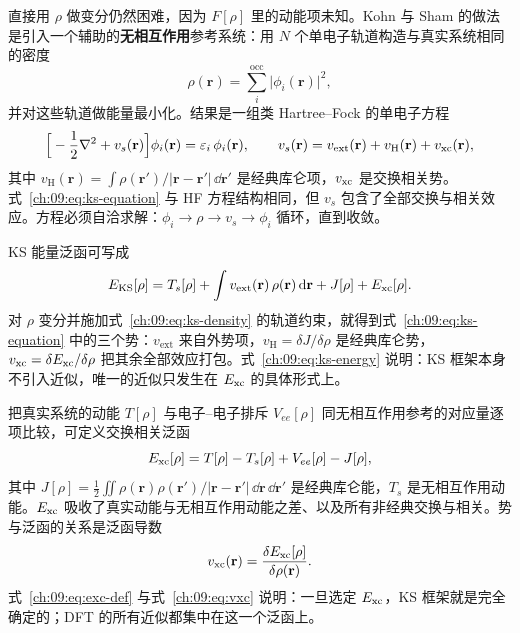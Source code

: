 直接用 $\rho$ 做变分仍然困难，因为 $F[\rho]$ 里的动能项未知。Kohn 与 Sham 的做法是引入一个辅助的\textbf{无相互作用}参考系统\citep{kohn1965,parr1989}：用 $N$ 个单电子轨道构造与真实系统相同的密度
\begin{equation}
\rho(\mathbf{r}) = \sum_{i}^{\mathrm{occ}} \lvert \phi_i(\mathbf{r})\rvert^2,
\label{ch:09:eq:ks-density}
\end{equation}
并对这些轨道做能量最小化。结果是一组类 Hartree--Fock 的单电子方程
\begin{equation}
\Big[-\frac{1}{2}\nabla^2 + v_s(\mathbf{r})\Big]\phi_i(\mathbf{r})
= \varepsilon_i\,\phi_i(\mathbf{r}),
\qquad
v_s(\mathbf{r}) = v_{\mathrm{ext}}(\mathbf{r}) + v_{\mathrm H}(\mathbf{r}) + v_{\mathrm{xc}}(\mathbf{r}),
\label{ch:09:eq:ks-equation}
\end{equation}
其中 $v_{\mathrm H}(\mathbf{r}) = \int \rho(\mathbf{r}')/\lvert \mathbf{r}-\mathbf{r}'\rvert\,\dd\mathbf{r}'$ 是经典库仑项，$v_{\mathrm{xc}}$ 是交换相关势。式~\eqref{ch:09:eq:ks-equation} 与 HF 方程结构相同，但 $v_s$ 包含了全部交换与相关效应。方程必须自洽求解：$\phi_i \to \rho \to v_s \to \phi_i$ 循环，直到收敛。

KS 能量泛函可写成
\begin{equation}
E_{\mathrm{KS}}[\rho]
= T_s[\rho] + \int v_{\mathrm{ext}}(\mathbf{r})\,\rho(\mathbf{r})\,\mathrm{d}\mathbf{r}
+ J[\rho] + E_{\mathrm{xc}}[\rho].
\label{ch:09:eq:ks-energy}
\end{equation}
对 $\rho$ 变分并施加式~\eqref{ch:09:eq:ks-density} 的轨道约束，就得到式~\eqref{ch:09:eq:ks-equation} 中的三个势：$v_{\mathrm{ext}}$ 来自外势项，$v_{\mathrm H} = \delta J/\delta\rho$ 是经典库仑势，$v_{\mathrm{xc}} = \delta E_{\mathrm{xc}}/\delta\rho$ 把其余全部效应打包。式~\eqref{ch:09:eq:ks-energy} 说明：KS 框架本身不引入近似，唯一的近似只发生在 $E_{\mathrm{xc}}$ 的具体形式上。

把真实系统的动能 $T[\rho]$ 与电子--电子排斥 $V_{ee}[\rho]$ 同无相互作用参考的对应量逐项比较，可定义交换相关泛函
\begin{equation}
E_{\mathrm{xc}}[\rho] = T[\rho] - T_s[\rho] + V_{ee}[\rho] - J[\rho],
\label{ch:09:eq:exc-def}
\end{equation}
其中 $J[\rho] = \tfrac12\iint \rho(\mathbf{r})\rho(\mathbf{r}')/\lvert \mathbf{r}-\mathbf{r}'\rvert\,\dd\mathbf{r}\,\dd\mathbf{r}'$ 是经典库仑能，$T_s$ 是无相互作用动能。$E_{\mathrm{xc}}$ 吸收了真实动能与无相互作用动能之差、以及所有非经典交换与相关。势与泛函的关系是泛函导数
\begin{equation}
v_{\mathrm{xc}}(\mathbf{r}) = \frac{\delta E_{\mathrm{xc}}[\rho]}{\delta \rho(\mathbf{r})}.
\label{ch:09:eq:vxc}
\end{equation}
式~\eqref{ch:09:eq:exc-def} 与式~\eqref{ch:09:eq:vxc} 说明：一旦选定 $E_{\mathrm{xc}}$，KS 框架就是完全确定的；DFT 的所有近似都集中在这一个泛函上。

